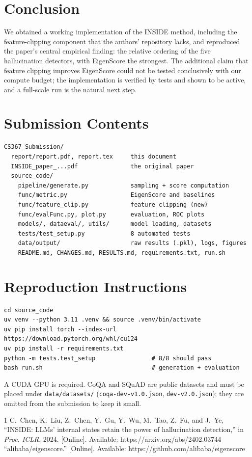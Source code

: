 \documentclass[conference]{IEEEtran}
\begin{document}
\section{Conclusion}
We obtained a working implementation of the INSIDE method, including the feature-clipping component that the authors' repository lacks, and reproduced the paper's central empirical finding: the relative ordering of the five hallucination detectors, with EigenScore the strongest. The additional claim that feature clipping improves EigenScore could not be tested conclusively with our compute budget; the implementation is verified by tests and shown to be active, and a full-scale run is the natural next step.


\section{Submission Contents}
\begin{lstlisting}
CS367_Submission/
  report/report.pdf, report.tex     this document
  INSIDE_paper_...pdf               the original paper
  source_code/
    pipeline/generate.py            sampling + score computation
    func/metric.py                  EigenScore and baselines
    func/feature_clip.py            feature clipping (new)
    func/evalFunc.py, plot.py       evaluation, ROC plots
    models/, dataeval/, utils/      model loading, datasets
    tests/test_setup.py             8 automated tests
    data/output/                    raw results (.pkl), logs, figures
    README.md, CHANGES.md, RESULTS.md, requirements.txt, run.sh
\end{lstlisting}

\section{Reproduction Instructions}
\begin{lstlisting}
cd source_code
uv venv --python 3.11 .venv && source .venv/bin/activate
uv pip install torch --index-url https://download.pytorch.org/whl/cu124
uv pip install -r requirements.txt
python -m tests.test_setup                # 8/8 should pass
bash run.sh                               # generation + evaluation
\end{lstlisting}
A CUDA GPU is required. CoQA and SQuAD are public datasets and must be placed under \texttt{data/datasets/} (\texttt{coqa-dev-v1.0.json}, \texttt{dev-v2.0.json}); they are omitted from the submission to keep it small.


\begin{thebibliography}{1}
 C.~Chen, K.~Liu, Z.~Chen, Y.~Gu, Y.~Wu, M.~Tao, Z.~Fu, and J.~Ye, ``INSIDE: LLMs' internal states retain the power of hallucination detection,'' in \emph{Proc. ICLR}, 2024. [Online]. Available: https://arxiv.org/abs/2402.03744
 ``alibaba/eigenscore.'' [Online]. Available: https://github.com/alibaba/eigenscore
\end{thebibliography}
\end{document}
